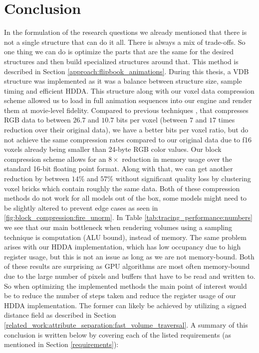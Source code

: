 \section{Conclusion} \label{conclusion}
In the formulation of the research questions we already mentioned that there is not a single structure that can do it all. There is always a mix of trade-offs. So one thing we can do is optimize the parts that are the same for the desired structures and then build specialized structures around that. This method is described in Section \ref{approach:flipbook_animations}. During this thesis, a VDB structure was implemented as it was a balance between structure size, sample timing and efficient HDDA. This structure along with our voxel data compression scheme allowed us to load in full animation sequences into our engine and render them at movie-level fidelity. Compared to previous techniques \cite{dolonius2017compressing}, that compresses RGB data to between $26.7$ and $10.7$ bits per voxel (between $7$ and $17$ times reduction over their original data), we have a better bits per voxel ratio, but do not achieve the same compression rates compared to our original data due to f16 voxels already being smaller than 24-byte RGB color values. Our block compression scheme allows for an $8\times$ reduction in memory usage over the standard 16-bit floating point format. Along with that, we can get another reduction by between $14\%$ and $57\%$ without significant quality loss by clustering voxel bricks which contain roughly the same data. Both of these compression methods do not work for all models out of the box, some models might need to be slightly altered to prevent edge cases as seen in \ref{fig:block_compression:fire_unorm}. In Table \ref{tab:tracing_performance:numbers} we see that our main bottleneck when rendering volumes using a sampling technique is computation (ALU bound), instead of memory. The same problem arises with our HDDA implementation, which has low occupancy due to high register usage, but this is not an issue as long as we are not memory-bound. Both of these results are surprising as GPU algorithms are most often memory-bound due to the large number of pixels and buffers that have to be read and written to. So when optimizing the implemented methods the main point of interest would be to reduce the number of steps taken and reduce the register usage of our HDDA implementation. The former can likely be achieved by utilizing a signed distance field as described in Section \ref{related_work:attribute_separation:fast_volume_traversal}. A summary of this conclusion is written below by covering each of the listed requirements (as mentioned in Section \ref{requirements}):

